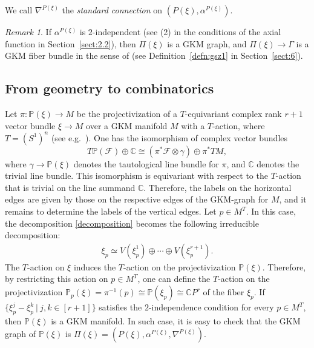 \documentclass[12pt]{amsart}
\theoremstyle{definition}
\theoremstyle{remark}
\newtheorem{remark}[theorem]{Remark}
\numberwithin{equation}{section}
\renewcommand{\P}{{\mathbb{P}}}
\begin{document}
We call $\nabla^{P(\xi)}$ the {\it standard connection} on $(P(\xi),\alpha^{P(\xi)})$.

\begin{remark}
If $\alpha^{P(\xi)}$ is $2$-independent (see (2) in the conditions of the axial function in Section~\ref{sect:2.2}), then $\Pi(\xi)$ is a GKM graph, and $\Pi(\xi)\to \Gamma$ is a GKM fiber bundle in the sense of \cite{GSZ} (see Definition~\ref{defn:gsz1} in
Section~\ref{sect:6}).
\end{remark}

\subsection{From geometry to combinatorics}
\label{sect:3.4}
Let $\pi:\P(\xi)\to M$ be the projectivization of a $T$-equivariant complex rank $r+1$ vector bundle $\xi\to M$ over a GKM manifold $M$ with a $T$-action, where $T=(S^1)^n$ (see e.g.~\cite[Section 3.1]{Ku10}).
One has the isomorphism of complex vector bundles
\[
T\P(\mathcal{F})\oplus\mathbb{C}\cong (\pi^{*}\mathcal{F}\otimes \gamma)\oplus \pi^{*} TM,
\]
where $\gamma\to\P(\xi)$ denotes the tautological line bundle for $\pi$, and $\mathbb{C}$ denotes the trivial line bundle.
This isomorphism is equivariant with respect to the $T$-action that is trivial on the line summand $\mathbb{C}$.
Therefore, the labels on the horizontal edges are given by those on the respective edges of the GKM-graph for $M$, and it remains to determine the labels of the vertical edges.
Let $p\in M^{T}$.
In this case, the decomposition \eqref{decomposition} becomes the following irreducible decomposition:
\begin{align*}
\xi_p\simeq V(\xi_{p}^{1})\oplus \cdots \oplus V(\xi_{p}^{r+1}).
\end{align*}
The $T$-action on $\xi$ induces the $T$-action on the projectivization $\P(\xi)$.
Therefore, by restricting this action on $p\in M^{T}$, one can define the $T$-action on the projectivization
$\P_{p}(\xi)=\pi^{-1}(p)\cong \P(\xi_p)\cong \mathbb{C}P^{r}$ of the fiber $\xi_p$.
If $\{\xi_{p}^{j}-\xi_{p}^{k}\ |\ j,k\in [r+1]\}$ satisfies the $2$-independence condition for every $p\in M^{T}$, then $\P(\xi)$ is a GKM manifold.
In such case, it is easy to check that the GKM graph of $\P(\xi)$ is $\Pi(\xi)=(P(\xi),\alpha^{P(\xi)}, \nabla^{P(\xi)})$.
\end{document}
